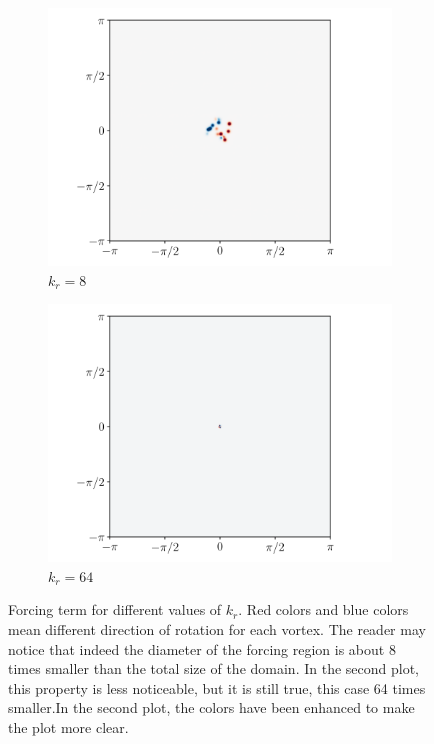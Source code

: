 \documentclass[../main.tex]{subfiles}
\begin{document}
\begin{figure}[ht]
	\centering
	\begin{subfigure}{0.49\textwidth}
		\centering
		\includegraphics[width=\textwidth]{images/forcing32_8.pdf}
		\caption{$k_r = 8$}
	\end{subfigure}
	\begin{subfigure}{0.49\textwidth}
		\centering
		\includegraphics[width=\textwidth]{images/forcing32_64.pdf}
		\caption{$k_r = 64$}
	\end{subfigure}
	\caption{Forcing term for different values of $k_r$. Red colors and blue colors mean different direction of rotation for each vortex. The reader may notice that indeed the diameter of the forcing region is about 8 times smaller than the total size of the domain. In the second plot, this property is less noticeable, but it is still true, this case 64 times smaller.In the second plot, the colors have been enhanced to make the plot more clear.}\label{fig:forcing}
\end{figure}
\end{document}
